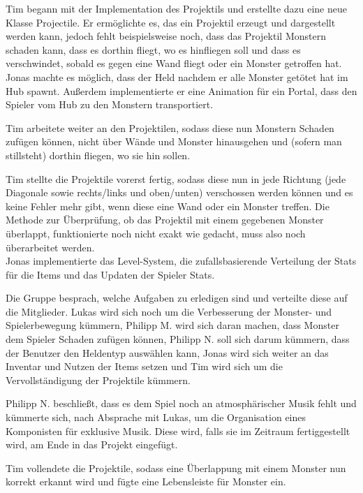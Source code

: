 
Tim begann mit der Implementation des Projektils und erstellte dazu eine neue Klasse \glqq{}Projectile\grqq{}. Er ermöglichte es, das ein Projektil erzeugt und dargestellt werden kann, jedoch fehlt beispielsweise noch, dass das Projektil Monstern schaden kann, dass es dorthin fliegt, wo es hinfliegen soll und dass es verschwindet, sobald es gegen eine Wand fliegt oder ein Monster getroffen hat. \\
Jonas machte es möglich, dass der Held nachdem er alle Monster getötet hat im Hub spawnt. Außerdem implementierte er eine Animation für ein Portal, dass den Spieler vom Hub zu den Monstern transportiert. \\


Tim arbeitete weiter an den Projektilen, sodass diese nun Monstern Schaden zufügen können, nicht über Wände und Monster hinausgehen und (sofern man stillsteht) dorthin fliegen, wo sie hin sollen. \\


Tim stellte die Projektile vorerst fertig, sodass diese nun in jede Richtung (jede Diagonale sowie rechts/links und oben/unten) verschossen werden können und es keine Fehler mehr gibt, wenn diese eine Wand oder ein Monster treffen. Die Methode zur Überprüfung, ob das Projektil mit einem gegebenen Monster überlappt, funktionierte noch nicht exakt wie gedacht, muss also noch überarbeitet werden. \\
Jonas implementierte das Level-System, die zufallsbasierende Verteilung der Stats für die Items und das Updaten der Spieler Stats. \\


Die Gruppe besprach, welche Aufgaben zu erledigen sind und verteilte diese auf die Mitglieder. Lukas wird sich noch um die Verbesserung der Monster- und Spielerbewegung kümmern, Philipp M. wird sich daran machen, dass Monster dem Spieler Schaden zufügen können, Philipp N. soll sich darum kümmern, dass der Benutzer den Heldentyp auswählen kann, Jonas wird sich weiter an das Inventar und Nutzen der Items setzen und Tim wird sich um die Vervollständigung der Projektile kümmern. \\


Philipp N. beschließt, dass es dem Spiel noch an atmosphärischer Musik fehlt und kümmerte sich, nach Absprache mit Lukas, um die Organisation eines Komponisten für exklusive Musik. Diese wird, falls sie im Zeitraum fertiggestellt wird, am Ende in das Projekt eingefügt. \\


Tim vollendete die Projektile, sodass eine Überlappung mit einem Monster nun korrekt erkannt wird und fügte eine Lebensleiste für Monster ein. \\


